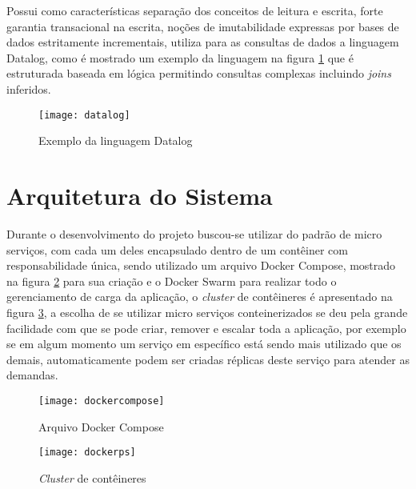 Possui como características separação dos conceitos de leitura e escrita, forte garantia transacional na escrita, noções de imutabilidade expressas por bases de dados estritamente incrementais, utiliza para as consultas de dados a linguagem Datalog, como é mostrado um exemplo da linguagem na figura \ref{fig:datalog} que é estruturada baseada em lógica permitindo consultas complexas incluindo \textit{joins} inferidos.~\cite{datomic} 

\begin{figure}[!h]
\caption{\label{fig:datalog} Exemplo da linguagem Datalog}
\begin{center}
\texttt{[image: datalog]}
\end{center}
\end{figure}

\section{Arquitetura do Sistema}
Durante o desenvolvimento do projeto buscou-se utilizar do padrão de micro serviços, com cada um deles encapsulado dentro de um contêiner com responsabilidade única, sendo utilizado um arquivo Docker Compose, mostrado na figura \ref{fig:dockercompose} para sua criação e o Docker Swarm para realizar todo o gerenciamento de carga da aplicação, o \textit{cluster} de contêineres é apresentado na figura \ref{fig:dockerps}, a escolha de se utilizar micro serviços conteinerizados se deu pela grande facilidade com que se pode criar, remover e escalar toda a aplicação, por exemplo se em algum momento um serviço em específico está sendo mais utilizado que os demais, automaticamente podem ser criadas réplicas deste serviço para atender as demandas.

\begin{figure}[!h]
\caption{\label{fig:dockercompose} Arquivo Docker Compose}
\begin{center}
\texttt{[image: dockercompose]}
\end{center}
\end{figure}

\begin{figure}[!h]
\caption{\label{fig:dockerps} \textit{Cluster} de contêineres}
\begin{center}
\texttt{[image: dockerps]}
\end{center}
\end{figure}

